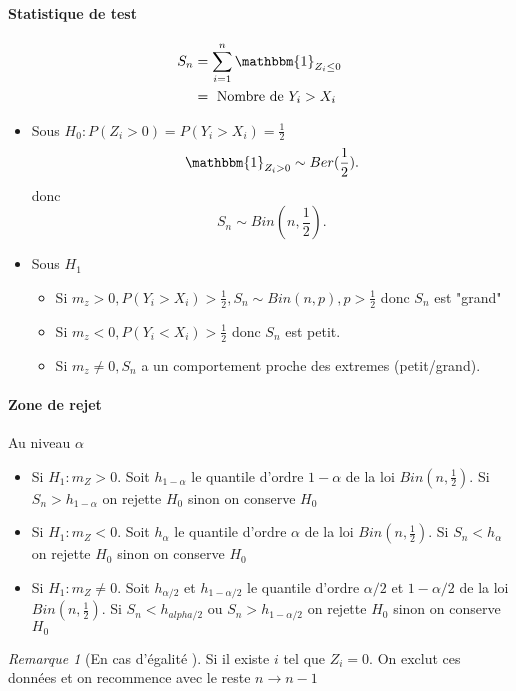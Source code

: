 \documentclass{article}
\theoremstyle{plain}%
\theoremstyle{definition}
\theoremstyle{remark}
\newtheorem*{rem}{Remarque}
\begin{document}
\paragraph*{Statistique de test}
\begin{align*}
    S_n &= \sum_{i=1}^{n}\mathbbm{1}_{Z_i \leq 0} \\
    &= \text{ Nombre de } Y_i > X_i
\end{align*}

\begin{itemize}
    \item Sous $ H_0 : P(Z_i > 0) = P(Y_i > X_i) = \frac{1}{2} $ 
    \[
        \mathbbm{1}_{Z_i > 0} \sim Ber(\frac{1}{2})
    .\]
    donc 
    \[
        S_n \sim Bin(n,\frac{1}{2})
    .\]

    \item Sous $ H_1 $ \begin{itemize}
        \item Si $ m_z > 0, P(Y_i > X_i) > \frac{1}{2}, S_n \sim Bin(n,p), p> \frac{1}{2} $ donc $ S_n $ est "grand"
        \item Si $ m_z < 0, P(Y_i < X_i) > \frac{1}{2} $ donc $ S_n $ est petit.
        \item Si $ m_z \neq  0, S_n $ a un comportement proche des extremes (petit/grand).
    \end{itemize}
\end{itemize}

\paragraph*{Zone de rejet}
Au niveau $ \alpha  $ \begin{itemize}
    \item Si $ H_1 : m_Z > 0 $. Soit $ h_{1 - \alpha } $ le quantile d'ordre $ 1 - \alpha  $ de la loi $ Bin(n,\frac{1}{2}) $. Si $ S_n > h_{1 - \alpha } $ on rejette $ H_0 $ sinon on conserve $ H_0 $ 
    \item Si $ H_1 : m_Z < 0 $. Soit $ h_{\alpha } $ le quantile d'ordre $ \alpha  $ de la loi $ Bin(n,\frac{1}{2}) $. Si $ S_n < h_{\alpha } $ on rejette $ H_0 $ sinon on conserve $ H_0 $ 
    \item Si $ H_1 : m_Z \neq 0 $. Soit $ h_{\alpha/2 } $ et $ h_{1 - \alpha /2} $  le quantile d'ordre $ \alpha /2 $ et $ 1 - \alpha /2 $ de la loi $ Bin(n,\frac{1}{2}) $. Si $ S_n < h_{alpha /2 } $ ou $ S_n > h_{1 - \alpha /2} $ on rejette $ H_0 $ sinon on conserve $ H_0 $ 
\end{itemize}
\begin{rem}[En cas d'égalité ]
    Si il existe $ i $ tel que $ Z_i = 0 $. On exclut ces données et on recommence avec le reste $ n \to n-1 $ 
\end{rem}
\end{document}
